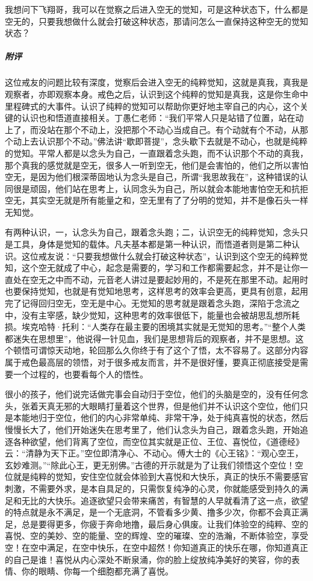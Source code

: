 \begin{case}
    我想问下飞翔哥，我可以在觉察之后进入空无的觉知，可是这种状态下，什么都是空无的，只要我想做什么就会打破这种状态，那请问怎么一直保持这种空无的觉知状态？
    \subparagraph{附评} 这位戒友的问题比较有深度，觉察后会进入空无的纯粹觉知，这就是真我，真我是观察者，亦即观察本身。戒色之后，认识到这个纯粹的觉知是真我，这是你生命中里程碑式的大事件。认识了纯粹的觉知可以帮助你更好地主宰自己的内心，这个关键的认识也和悟道直接相关。丁愚仁老师：“我们平常人只是站错了位置，站在动上了，而没站在那个不动上，没把那个不动心当成自己。有个动就有个不动，从那个动上去认识那个不动。”佛法讲“歇即菩提”，念头歇下去就是不动心，也就是纯粹的觉知。平常人都是以念头为自己，一直跟着念头跑，而不认识那个不动的真我，那个真我的感觉就是空无，很多人一听到空无，他们是会害怕的，他们之所以害怕空无，是因为他们根深蒂固地认为念头是自己，所谓“我思故我在”，这种错误的认同很是顽固，他们站在思考上，认同念头为自己，所以就会本能地害怕空无和抗拒空无，其实空无就是所有能量之和，空无里有了了分明的觉知，并不是像石头一样无知觉。

    有两种认识，一，认念头为自己，跟着念头跑；二，认识空无的纯粹觉知，念头只是工具，身体是觉知的载体。凡夫基本都是第一种认识，而悟道者则是第二种认识。这位戒友说：“只要我想做什么就会打破这种状态”，认识到这个空无的纯粹觉知，这个空无就成了中心，起念是需要的，学习和工作都需要起念，并不是让你一直处在空无之中而不动，元音老人讲过是要起妙用的，不是死在那里不动。起用时也要保持觉知，也就是有觉知地思考，这样思考的效率会更高，更具有创意，起用完了记得回归空无，空无是中心。无觉知的思考就是跟着念头跑，深陷于念流之中，没有主宰感，缺少觉知，这种思考的效率很低下，能量也会被胡思乱想所耗损。埃克哈特·托利：“人类存在最主要的困境其实就是无觉知的思考。”“整个人类都迷失在思想里”，他说得一针见血，我们是思想背后的观察者，并不是思想。这个顿悟可谓惊天动地，轮回那么久你终于有了这个了悟，太不容易了。这部分内容属于戒色最高层的领悟，对于很多戒友而言，并不是很好懂，要真正彻底接受是需要一个过程的，也要看每个人的悟性。

    很小的孩子，他们说完话做完事会自动归于空位，他们的头脑是空的，没有任何念头，张着天真无邪的大眼睛打量着这个世界，但是他们并不认识这个空位，他们只是本能地归于空位，他们的内心非常单纯、非常干净，处于纯真喜悦的状态，然后慢慢长大了，他们开始迷失在思考里了，他们认念头为自己，跟着念头跑，开始追逐各种欲望，他们背离了空位，而空位其实就是正位、王位、喜悦位，《道德经》云：“清静为天下正。”空位即清净心、不动心。傅大士的《心王铭》：“观心空王，玄妙难测。”“除此心王，更无别佛。”古德的开示就是为了让我们领悟这个空位！空位就是纯粹的觉知，安住空位就会体验到大喜悦和大快乐，真正的快乐不需要感官刺激，不需要外求，是本自具足的，只需恢复纯净的心灵，你就能感受到持久的满足和无比的大快乐。追逐欲望只会带来痛苦，有智慧的人早就看清了这一点，欲望的特点就是永不满足，是一个无底洞，不管看多少黄、撸多少次，你都不会真正满足，总是要得更多，你疲于奔命地撸，最后身心俱废。让我们体验空的纯粹、空的喜悦、空的美妙、空的能量、空的辉煌、空的璀璨、空的浩瀚，不断体验空，享受空！在空中满足，在空中快乐，在空中超然！你知道真正的快乐在哪，你知道真正的自己是谁！喜悦从内心深处不断泉涌，你的脸上绽放纯净美好的笑容，你的表情、你的眼睛、你每一个细胞都充满了喜悦。
\end{case}

